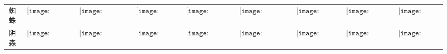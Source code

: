\begin{longtable}{|c|cccccccc|}
蜘蛛&$\begin{array}{c}\texttt{[image: figures/Spider\_Candle.png]}\end{array}$&$\begin{array}{c}\texttt{[image: figures/Spider\_Candelabra.png]}\end{array}$&$\begin{array}{c}\texttt{[image: figures/Spider\_Lamp.png]}\end{array}$&$\begin{array}{c}\texttt{[image: figures/Spider\_Lantern.png]}\end{array}$&$\begin{array}{c}\texttt{[image: figures/Spider\_Chandelier.png]}\end{array}$&$\begin{array}{c}\texttt{[image: figures/Spider\_Door.png]}\end{array}$&$\begin{array}{c}\texttt{[image: figures/Spider\_Toilet.png]}\end{array}$&$\begin{array}{c}\texttt{[image: figures/Spider\_Chest.png]}\end{array}$\\
阴森&$\begin{array}{c}\texttt{[image: figures/Spooky\_Candle.png]}\end{array}$&$\begin{array}{c}\texttt{[image: figures/Spooky\_Candelabra.png]}\end{array}$&$\begin{array}{c}\texttt{[image: figures/Spooky\_Lamp.png]}\end{array}$&$\begin{array}{c}\texttt{[image: figures/Spooky\_Lantern.png]}\end{array}$&$\begin{array}{c}\texttt{[image: figures/Spooky\_Chandelier.png]}\end{array}$&$\begin{array}{c}\texttt{[image: figures/Spooky\_Door.png]}\end{array}$&$\begin{array}{c}\texttt{[image: figures/Spooky\_Toilet.png]}\end{array}$&$\begin{array}{c}\texttt{[image: figures/Spooky\_Chest.png]}\end{array}$\\

\end{longtable}
